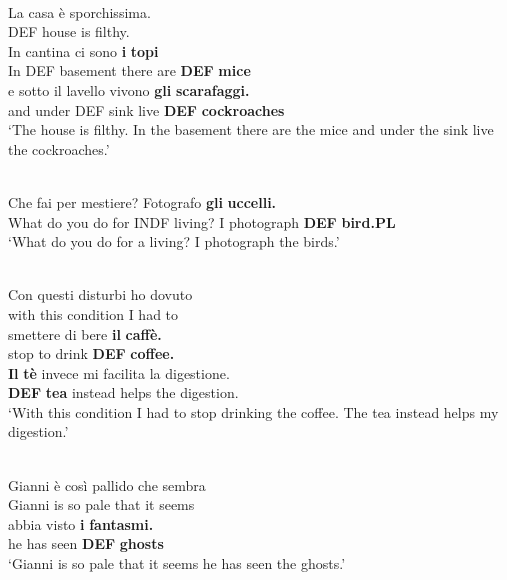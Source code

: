 \z

\ea \label{} 
\\
\gll La  casa  è  sporchissima.\\
DEF  house  is  filthy.\\
\gll In  cantina  ci  sono  \textbf{i} \textbf{topi}\\
In DEF  basement  there  are  \textbf{DEF} \textbf{mice}\\
\gll e  sotto  il  lavello  vivono  \textbf{gli} \textbf{scarafaggi.}\\
and  under  DEF  sink  live  \textbf{DEF} \textbf{cockroaches}\\
\glt ‘The house is filthy. In the basement there are the mice and under the sink live the cockroaches.’  

\z

\ea \label{} 
\\
\gll Che  fai  per  mestiere?  Fotografo  \textbf{gli} \textbf{  uccelli.}\\
What do you  do  for  INDF living?  I photograph  \textbf{DEF} \textbf{bird.PL}\\
\glt ‘What do you do for a living? I photograph the birds.’

\z

\ea \label{} 
\\
\gll Con  questi  disturbi  ho  dovuto\\
with  this  condition  I  had to\\
\gll smettere  di  bere  \textbf{il} \textbf{caffè.} \\
stop  to  drink  \textbf{DEF} \textbf{coffee.}\\
\gll \textbf{Il} \textbf{tè} invece  mi facilita  la digestione.\\
\textbf{DEF} \textbf{tea} instead  helps  the digestion.\\
\glt ‘With this condition I had to stop drinking the coffee. The tea instead helps my digestion.’

\z

\ea \label{} 
\\
	\gll Gianni  è  così  pallido  che  sembra\\
Gianni  is  so  pale  that  it seems\\
\gll abbia  visto  \textbf{i} \textbf{fantasmi.}   \\
he has  seen  \textbf{DEF} \textbf{ghosts}   \\
\glt ‘Gianni is so pale that it seems he has seen the ghosts.’

